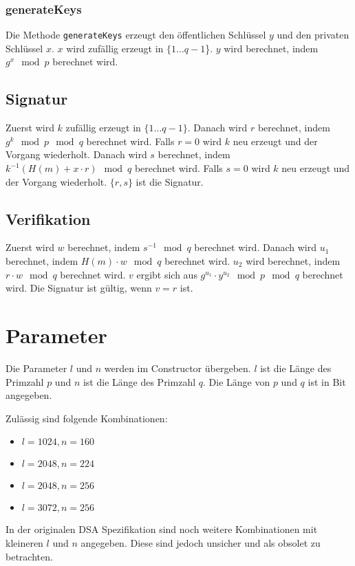 \subsubsection{generateKeys}
Die Methode \texttt{generateKeys} erzeugt den öffentlichen Schlüssel $y$ und den privaten Schlüssel $x$. $x$ wird zufällig erzeugt in $\{1 ... q-1$\}. $y$ wird berechnet, indem $g^x \mod p$ berechnet wird.

\subsection{Signatur}
Zuerst wird $k$ zufällig erzeugt in $\{1 ... q-1\}$. Danach wird $r$ berechnet, indem $g^k \mod p \mod q$ berechnet wird. Falls $r = 0$ wird $k$ neu erzeugt und der Vorgang wiederholt. Danach wird $s$ berechnet, indem $k^{-1} (H(m) + x \cdot r) \mod q$ berechnet wird. Falls $s = 0$ wird $k$ neu erzeugt und der Vorgang wiederholt. $\{ r , s \}$ ist die Signatur.

\subsection{Verifikation}
Zuerst wird $w$ berechnet, indem $s^{-1} \mod q$ berechnet wird. Danach wird $u_1$ berechnet, indem $H(m) \cdot w \mod q$ berechnet wird. $u_2$ wird berechnet, indem $r \cdot w \mod q$ berechnet wird. $v$ ergibt sich aus $g^{u_1} \cdot y^{u_2} \mod p \mod q$ berechnet wird. Die Signatur ist gültig, wenn $v = r$ ist.

\section{Parameter}
Die Parameter $l$ und $n$ werden im Constructor übergeben. $l$ ist die Länge des Primzahl $p$ und $n$ ist die Länge des Primzahl $q$. Die Länge von $p$ und $q$ ist in Bit angegeben.

Zulässig sind folgende Kombinationen:
\begin{itemize}
    \item $l = 1024, n = 160$
    \item $l = 2048, n = 224$
    \item $l = 2048, n = 256$
    \item $l = 3072, n = 256$
\end{itemize}

In der originalen DSA Spezifikation sind noch weitere Kombinationen mit kleineren $l$ und $n$ angegeben. Diese sind jedoch unsicher und als obsolet zu betrachten.

